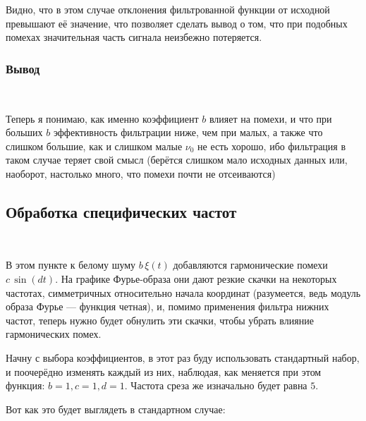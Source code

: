 \documentclass[a4paper]{article}
\begin{document}
Видно, что в этом случае отклонения фильтрованной функции от исходной превышают её значение, что позволяет сделать вывод о том, что при подобных помехах значительная часть сигнала неизбежно потеряется.

\subsubsection{Вывод}\

Теперь я понимаю, как именно коэффициент $b$ влияет на помехи, и что при больших $b$ эффективность фильтрации ниже, чем при малых, а также что слишком большие, как и слишком малые $\nu_0$ не есть хорошо, ибо фильтрация в таком случае теряет свой смысл (берётся слишком мало исходных данных или, наоборот, настолько много, что помехи почти не отсеиваются)

\subsection{Обработка специфических частот}\

В этом пункте к белому шуму $b \, \xi (t)$ добавляются гармонические помехи $c \, \sin{(dt)}$. На графике Фурье-образа они дают резкие скачки на некоторых частотах, симметричных относительно начала координат (разумеется, ведь модуль образа Фурье --- функция четная), и, помимо применения фильтра нижних частот, теперь нужно будет обнулить эти скачки, чтобы убрать влияние гармонических помех.\

Начну с выбора коэффициентов, в этот раз буду использовать стандартный набор, и поочерёдно изменять каждый из них, наблюдая, как меняется при этом функция: $b = 1, c = 1, d = 1$. Частота среза же изначально будет равна $5$.\ 

Вот как это будет выглядеть в стандартном случае:
\end{document}
